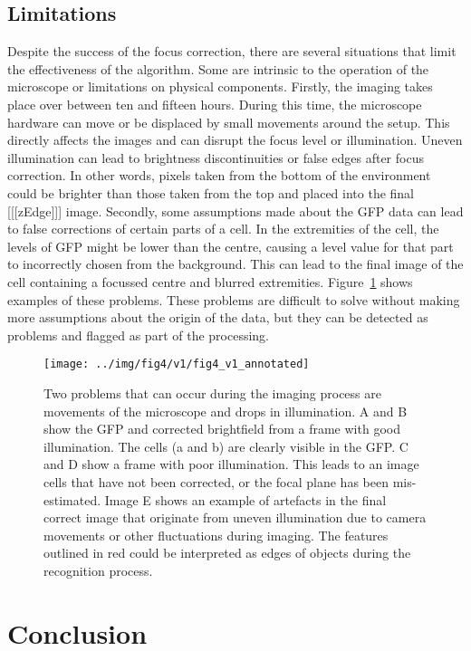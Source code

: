 \documentclass[preprint,11pt,5p,twocolumn]{elsarticle}
\begin{document}
\subsection{Limitations}

Despite the success of the focus correction, there are several situations that limit the effectiveness of the algorithm. Some are intrinsic to the operation of the microscope or limitations on physical components. Firstly, the imaging takes place over between ten and fifteen hours. During this time, the microscope hardware can move or be displaced by small movements around the setup. This directly affects the images and can disrupt the focus level or illumination. Uneven illumination can lead to brightness discontinuities or false edges after focus correction. In other words, pixels taken from the bottom of the environment could be brighter than those taken from the top and placed into the final [[[zEdge]]] image. Secondly, some assumptions made about the GFP data can lead to false corrections of certain parts of a cell. In the extremities of the cell, the levels of GFP might be lower than the centre, causing a level value for that part to incorrectly chosen from the background. This can lead to the final image of the cell containing a focussed centre and blurred extremities. Figure~\ref{fig:problems} shows examples of these problems. These problems are difficult to solve without making more assumptions about the origin of the data, but they can be detected as problems and flagged as part of the processing.

\begin{figure}
\centering\texttt{[image: ../img/fig4/v1/fig4\_v1\_annotated]}
\label{fig:problems}
\caption{Two problems that can occur during the imaging process are movements of the microscope and drops in illumination. A and B show the GFP and corrected brightfield from a frame with good illumination. The cells (a and b) are clearly visible in the GFP. C and D show a frame with poor illumination. This leads to an image cells that have not been corrected, or the focal plane has been mis-estimated. Image E shows an example of artefacts in the final correct image that originate from uneven illumination due to camera movements or other fluctuations during imaging. The features outlined in red could be interpreted as edges of objects during the recognition process.}
\end{figure}

\section{Conclusion}
\end{document}
